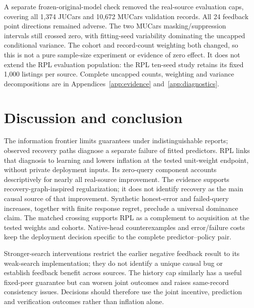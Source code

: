 \documentclass[11pt]{article}
\begin{document}
A separate frozen-original-model check removed the real-source evaluation
caps, covering all 1,374 JUCars and 10,672 MUCars validation records. All 24
feedback point directions remained adverse. The two MUCars masking/suppression
intervals still crossed zero, with fitting-seed variability dominating the
uncapped conditional variance. The cohort and record-count weighting both
changed, so this is not a pure sample-size experiment or evidence of zero
effect. It does not extend the RPL evaluation population: the RPL ten-seed
study retains its fixed 1,000 listings per source. Complete uncapped counts,
weighting and variance decompositions are in
Appendices~\ref{app:evidence} and~\ref{app:diagnostics}.

\clearpage
\section{Discussion and conclusion}\label{sec:discussion}\label{sec:conclusion}
The information frontier limits guarantees under indistinguishable reports;
observed recovery paths diagnose a separate failure of fitted predictors.
RPL links that diagnosis to learning and lowers inflation at the tested
unit-weight endpoint, without private deployment inputs. Its zero-query
component accounts descriptively for nearly all real-source improvement.
The evidence supports recovery-graph-inspired regularization; it does not
identify recovery as the main causal source of that improvement.
Synthetic honest-error and failed-query increases, together with finite
response regret, preclude a universal dominance claim. The matched crossing
supports RPL as a complement to acquisition at the tested weights and cohorts.
Native-head counterexamples and error/failure costs keep the deployment
decision specific to the complete predictor--policy pair.

Stronger-search interventions restrict the earlier negative feedback result
to its weak-search implementation; they do not identify a unique causal bug
or establish feedback benefit across sources. The history cap similarly has
a useful fixed-peer guarantee but can worsen joint outcomes and raises
same-record consistency issues. Decisions should therefore use the joint
incentive, prediction and verification outcomes rather than inflation alone.
\end{document}
